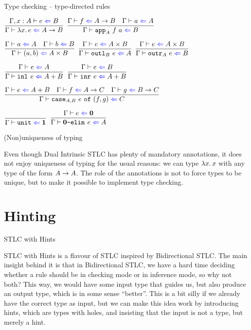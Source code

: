 \documentclass{beamer}
\begin{document}
\begin{frame}{Type checking -- type-directed rules}

\begin{center}
  $\infrule{\check[\extend{\Gamma}{x}{A}]{e}{B}}{\check{\fun{x}{e}}{\Fun{A}{B}}}$ \enspace
  $\infrule{\check{f}{\Fun{A}{B}} \quad \check{a}{A}}{\check{\app[A]{f}{a}}{B}}$

  \vspace{2em}

  $\infrule{\check{a}{A} \quad \check{b}{B}}{\check{\pair{a}{b}}{\Prod{A}{B}}}$ \enspace
  $\infrule{\check{e}{\Prod{A}{B}}}{\check{\outl[B]{e}}{A}}$ \enspace
  $\infrule{\check{e}{\Prod{A}{B}}}{\check{\outr[A]{e}}{B}}$

  \vspace{2em}

  $\infrule{\check{e}{A}}{\check{\inl{e}}{\Sum{A}{B}}}$ \quad
  $\infrule{\check{e}{B}}{\check{\inr{e}}{\Sum{A}{B}}}$

  \vspace{2em}

  $\infrule{\check{e}{\Sum{A}{B}} \quad \check{f}{\Fun{A}{C}} \quad \check{g}{\Fun{B}{C}}}{\check{\caseannot{A}{B}{e}{f}{g}}{C}}$

  \vspace{2em}

  $\infrule{}{\check{\unit}{\Unit}}$ \quad
  $\infrule{\check{e}{\Empty}}{\check{\emptyelim{e}}{A}}$
\end{center}

\end{frame}

\begin{frame}{(Non)uniqueness of typing}

Even though Dual Intrinsic STLC has plenty of mandatory annotations, it does not enjoy uniqueness of typing for the usual reasons: we can type $\fun{x}{x}$ with any type of the form $A \to A$. The role of the annotations is not to force types to be unique, but to make it possible to implement type checking.

\end{frame}

\section{Hinting}

\begin{frame}{STLC with Hints}

STLC with Hints is a flavour of STLC inspired by Bidirectional STLC. The main insight behind it is that in Bidirectional STLC, we have a hard time deciding whether a rule should be in checking mode or in inference mode, so why not both? This way, we would have some input type that guides us, but also produce an output type, which is in some sense ``better''. This is a bit silly if we already have the correct type as input, but we can make this idea work by introducing hints, which are types with holes, and insisting that the input is not a type, but merely a hint.

\end{frame}
\end{document}
